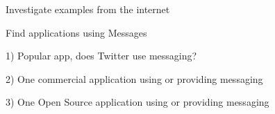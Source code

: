 \documentclass[Screen16to9,17pt]{foils}
\begin{document}

\slide{}

Investigate examples from the internet

Find applications using Messages

1) Popular app, does Twitter use messaging?

2) One commercial application using or providing messaging

3) One Open Source application using or providing messaging



\slidenext
\end{document}
